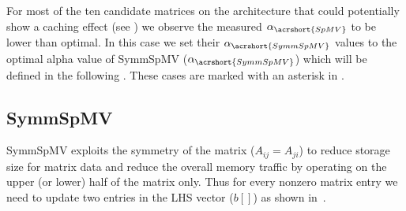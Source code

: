 For most of the ten candidate matrices on the \SKX architecture that could
potentially show a caching effect (see ) we
observe the measured $\alpha_{\acrshort{SpMV}}$ to be lower than
optimal. In this case we set their $\alpha_{\acrshort{SymmSpMV}}$ values to the optimal alpha value
of \acrshort{SymmSpMV} ($\alpha_{\acrshort{SymmSpMV}}$) which will be
defined in the following . These cases are marked
with an asterisk in .
 
\begin{comment}
\subsubsection{\SpMTV}
Sparse Matrix Transpose Vector multiplication (\SpMTV) is a kernel with a \DTWO dependency.
\begin{algorithm}[H]
	\caption{SpMTV Find $b$ : $b=A'x$} 
	\label{alg:SpMTV}
	\begin{algorithmic}[1]
		\FOR{$row=1:nrows$}
		\FOR{$idx=rowPtr[row]:rowPtr[row+1]$}
		\STATE{$b[col[idx]] += A[idx]*x[row]$} 
		\ENDFOR
		\ENDFOR
	\end{algorithmic}
\end{algorithm}
In comparison to \acrshort{SpMV} it requires scattered writes, which require attention in order to avoid race conditions when executing in parallel. The arithmetic intensity of the kernel $I_\mathrm{\SpMTV}$ is
\begin{equation}
\label{eq:SpMTV_intensity}
I_\mathrm{\SpMTV} (\alpha)= \frac{2}{8+4+16\alpha+8/\acrshort{NNZR}} \\
\end{equation}
In ideal case data traffic for this kernel should remain close to that of SpMV, if \acrshort{NNZR} are sufficiently high, and $\alpha$ factor is small enough.
\end{comment}

\subsection{\acrshort{SymmSpMV}}
\label{sect:SymmSpmv}

\Acrshort{SymmSpMV} exploits the symmetry of the matrix ($A_{ij}=A_{ji}$)
to reduce storage size for matrix data and reduce the overall memory
traffic by operating on the upper (or lower) half of the matrix
only. Thus for every nonzero matrix entry we need to update two
entries in the LHS vector ($b[]$) as shown in~.

